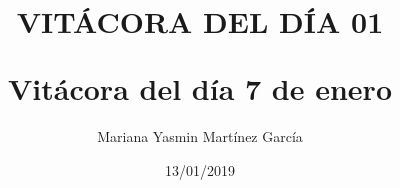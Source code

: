 \documentclass[letterpaper, 12pt, twoside]{article}
\title{\Huge\item\color{red}\textbf {VITÁCORA DEL DÍA 01}}
\author{Mariana Yasmin Martínez García}
\date{13/01/2019}
\begin{document}
	\maketitle
	\begin{figure}
		\centering
		\caption{}
		\label{fig:1}
	\end{figure}
	
	
	\newpage
	
	\title{\large\textbf{Vitácora del día 7 de enero\\}}
	
\end{document}
